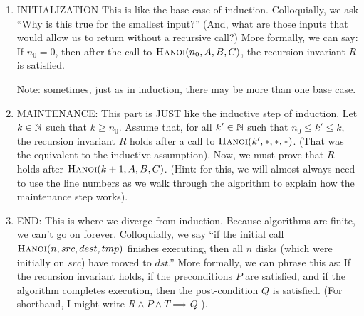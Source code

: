 \documentclass{article}
\begin{document}
\begin{enumerate}
    \pagebreak
    \item INITIALIZATION This is like the base case of induction.  Colloquially,
        we ask ``Why is this
        true for the smallest input?'' (And, what are those inputs that
        would allow us to return without a recursive call?)  More formally, we
        can say: If $n_0=0$, then after the call to
        $\textsc{Hanoi}(n_0,A,B,C)$, the recursion invariant $R$ is satisfied.

        \answer

        Note: sometimes, just as in induction, there may be more than one base case.

    \item MAINTENANCE: This part is JUST like the inductive step of induction.
        Let $k \in {\mathbb N}$ such that $k \geq n_0$.  Assume that, for all $k'\in {\mathbb N}$ such that
        $n_0 \leq k' \leq k$, the recursion invariant $R$ holds after a call to
        $\textsc{Hanoi}(k',*,*,*)$. (That was the equivalent to the inductive
        assumption).  Now, we must prove that $R$ holds after
        $\textsc{Hanoi}(k+1,A,B,C)$. (Hint: for this, we will almost always need
        to use the line numbers as we walk
        through the algorithm to explain how the maintenance step works).

        \answer

    \item END: This is where we diverge from induction.  Because algorithms are
        finite, we can't go on forever. Colloquially, we say ``if the initial call
        $\textsc{Hanoi}(n,src,dest,tmp)$ finishes executing, then all $n$ disks
        (which were initially on $src$) have moved to $dst$.'' More formally, we
        can phrase this as: If the recursion invariant holds, if the
        preconditions $P$ are satisfied, and if the algorithm
        completes execution, then the post-condition $Q$ is satisfied.
        (For shorthand, I might write $R \wedge P \wedge T \implies Q$ ).

        \answer

\end{enumerate}



\end{document}
